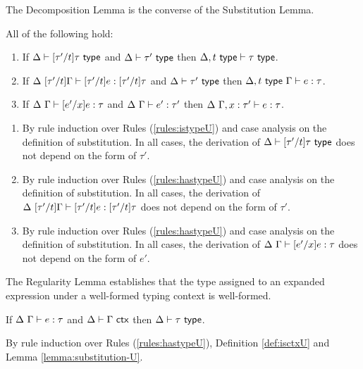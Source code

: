 The Decomposition Lemma is the converse of the Substitution Lemma.
\begin{lemma}[Decomposition]\label{lemma:decomposition-U} All of the following hold:
\begin{enumerate}
\item If $\Delta \vdash [\tau'/t]\tau~\mathsf{type}$ and $\Delta \vdash \tau'~\mathsf{type}$ then $\Delta, t~\mathsf{type} \vdash \tau~\mathsf{type}$.
\item If $\Delta~[\tau'/t]\Gamma \vdash [\tau'/t]e : [\tau'/t]\tau$ and $\Delta \vdash \tau'~\mathsf{type}$ then $\Delta, t~\mathsf{type}~\Gamma \vdash e : \tau$.
\item If $\Delta~\Gamma \vdash [e'/x]e : \tau$ and $\Delta~\Gamma \vdash e' : \tau'$ then $\Delta~\Gamma, x : \tau' \vdash e : \tau$.
\end{enumerate}\end{lemma}
\begin{proof-sketch}
\begin{enumerate}
\item By rule induction over Rules (\ref{rules:istypeU}) and case analysis on the definition of substitution. In all cases, the derivation of $\Delta \vdash [\tau'/t]\tau~\mathsf{type}$ does not depend on the form of $\tau'$.
\item By rule induction over Rules (\ref{rules:hastypeU}) and case analysis on the definition of substitution. In all cases, the derivation of $\Delta~[\tau'/t]\Gamma \vdash [\tau'/t]e : [\tau'/t]\tau$ does not depend on the form of $\tau'$.
\item By rule induction over Rules (\ref{rules:hastypeU}) and case analysis on the definition of substitution. In all cases, the derivation of $\Delta~\Gamma \vdash [e'/x]e : \tau$ does not depend on the form of $e'$.
\end{enumerate}
\end{proof-sketch}

The Regularity Lemma establishes that the type assigned to an expanded expression under a well-formed typing context is well-formed. 
\begin{lemma}[Regularity]\label{lemma:regularity-U} If $\Delta~\Gamma \vdash e : \tau$ and $\Delta \vdash \Gamma~\mathsf{ctx}$ then $\Delta \vdash \tau~\mathsf{type}$.\end{lemma}
\begin{proof-sketch}
By rule induction over Rules (\ref{rules:hastypeU}), Definition \ref{def:isctxU} and Lemma \ref{lemma:substitution-U}.
\end{proof-sketch}
